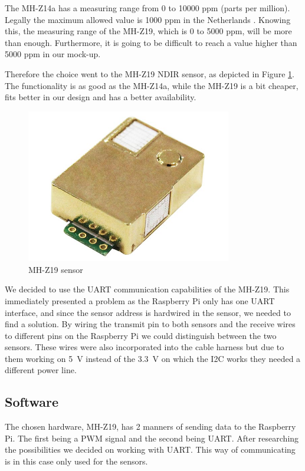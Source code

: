 \documentclass[a4paper,oneside]{book}
\begin{document}
The MH-Z14a has a measuring range from 0 to 10000 ppm (parts per million).
Legally the maximum allowed  value is 1000 ppm in the Netherlands
\cite{bouwbesluit}. Knowing this, the measuring range of the MH-Z19, which is 0
to 5000 ppm, will be more than enough. Furthermore, it is going to be difficult
to reach a  value higher than 5000 ppm in our mock-up.

Therefore the choice went to the MH-Z19 NDIR sensor, as depicted in Figure
\ref{fig:mh-z19}. The functionality is as good as the MH-Z14a, while the
MH-Z19 is a bit cheaper, fits better in our design and has a better
availability.

\begin{figure}[h]
\centering
\includegraphics[width=0.8\textwidth]{images/co2.jpg}
\caption{MH-Z19  sensor \protect\cite{mh-z19}}
\label{fig:mh-z19}
\end{figure}

We decided to use the UART communication capabilities of the MH-Z19. This
immediately presented a problem as the Raspberry Pi only has one UART
interface, and since the sensor address is hardwired in the sensor, we needed
to find a solution. By wiring the transmit pin to both sensors and the receive
wires to different pins on the Raspberry Pi we could distinguish between the
two sensors. These wires were also incorporated into the cable harness but due
to them working on \SI{5}{\volt} instead of the \SI{3.3}{\volt} on which the
I2C works they needed a different power line.

\subsection{Software}
The chosen hardware, MH-Z19, has 2 manners of sending data to the Raspberry Pi.
The first being a PWM signal and the second being UART. After researching the
possibilities we decided on working with UART. This way of communicating is in
this case only used for the  sensors.
\end{document}
